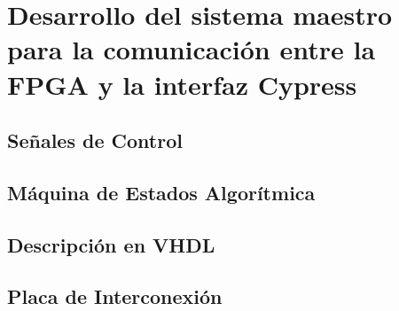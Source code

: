 \chapter{Desarrollo del sistema maestro para la comunicación entre la FPGA y la interfaz Cypress}
	\label{cap:fpga}
	
%		
	\section{Señales de Control}
		
	\section{Máquina de Estados Algorítmica}
		
	\section{Descripción en VHDL}
		
	\section{Placa de Interconexión}
		